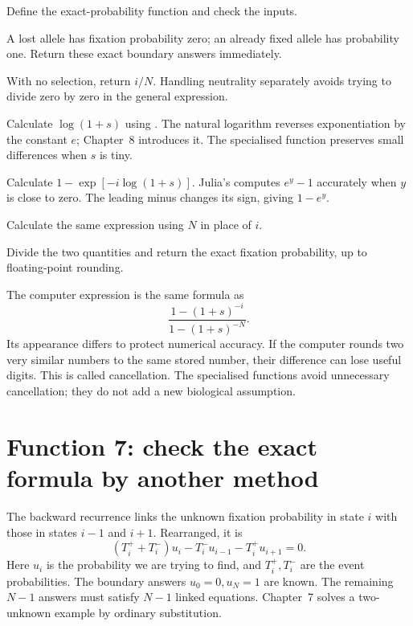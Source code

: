 \begin{description}[style=nextline]
\item[Lines 84--85] Define the exact-probability function and check the inputs.
\item[Lines 86--89] A lost allele has fixation probability zero; an already fixed allele has probability one. Return these exact boundary answers immediately.
\item[Lines 90--92] With no selection, return \(i/N\). Handling neutrality separately avoids trying to divide zero by zero in the general expression.
\item[Line 93] Calculate \(\log(1+s)\) using . The natural logarithm reverses exponentiation by the constant \(e\); Chapter~8 introduces it. The specialised function preserves small differences when \(s\) is tiny.
\item[Line 94] Calculate \(1-\exp[-i\log(1+s)]\). Julia's  computes \(e^y-1\) accurately when \(y\) is close to zero. The leading minus changes its sign, giving \(1-e^y\).
\item[Line 95] Calculate the same expression using \(N\) in place of \(i\).
\item[Lines 96--97] Divide the two quantities and return the exact fixation probability, up to floating-point rounding.
\end{description}

The computer expression is the same formula as
\[
\frac{1-(1+s)^{-i}}{1-(1+s)^{-N}}.
\]
Its appearance differs to protect numerical accuracy. If the computer rounds two very similar numbers to the same stored number, their difference can lose useful digits. This is called cancellation. The specialised functions avoid unnecessary cancellation; they do not add a new biological assumption.

\section{Function 7: check the exact formula by another method}


The backward recurrence links the unknown fixation probability in state \(i\) with those in states \(i-1\) and \(i+1\). Rearranged, it is
\[
(T_i^++T_i^-)u_i-T_i^-u_{i-1}-T_i^+u_{i+1}=0.
\]
Here \(u_i\) is the probability we are trying to find, and \(T_i^+,T_i^-\) are the event probabilities. The boundary answers \(u_0=0,u_N=1\) are known. The remaining \(N-1\) answers must satisfy \(N-1\) linked equations. Chapter~7 solves a two-unknown example by ordinary substitution.

